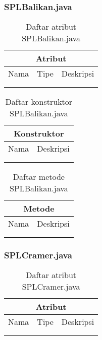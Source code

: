 \subsubsection{SPLBalikan.java}

\begin{table}[H]
    \centering
    \begin{tabular}{c|c|c}
        \hline
        \hline
        \multicolumn{3}{c}{\textbf{Atribut}}\\
        \hline
        \hline
         Nama & Tipe & Deskripsi \\
         \hline 
         \hline 
         &  & \\
         &  & \\
    \end{tabular}
    \caption{Daftar atribut SPLBalikan.java}
\end{table}

\begin{table}[H]
    \centering
    \begin{tabular}{c|c}
        \hline
        \hline
        \multicolumn{2}{c}{\textbf{Konstruktor}}\\
        \hline
        \hline
         Nama  & Deskripsi \\
         \hline 
         \hline 
         &  \\
         &  \\
    \end{tabular}
    \caption{Daftar konstruktor SPLBalikan.java}
\end{table}

\begin{table}[H]
    \centering
    \begin{tabular}{c|c}
        \hline
        \hline
        \multicolumn{2}{c}{\textbf{Metode}}\\
        \hline
        \hline
         Nama  & Deskripsi \\
         \hline 
         \hline 
         &  \\
         &  \\
    \end{tabular}
    \caption{Daftar metode SPLBalikan.java}
\end{table}

\subsubsection{SPLCramer.java}

\begin{table}[H]
    \centering
    \begin{tabular}{c|c|c}
        \hline
        \hline
        \multicolumn{3}{c}{\textbf{Atribut}}\\
        \hline
        \hline
         Nama & Tipe & Deskripsi \\
         \hline 
         \hline 
         &  & \\
         &  & \\
    \end{tabular}
    \caption{Daftar atribut SPLCramer.java}
\end{table}

